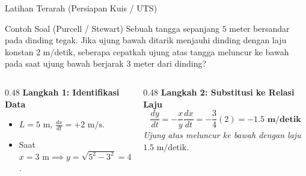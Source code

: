 \documentclass[aspectratio=169,10pt]{beamer}
\begin{document}
\begin{frame}{Latihan Terarah (Persiapan Kuis / UTS)}
    \begin{block}{Contoh Soal (Purcell / Stewart)}
        Sebuah tangga sepanjang $5\text{ meter}$ bersandar pada dinding tegak. 
        Jika ujung bawah ditarik menjauhi dinding dengan laju konstan $2\text{ m/detik}$,
        seberapa cepatkah ujung atas tangga meluncur ke bawah pada saat ujung bawah berjarak $3\text{ meter}$ dari dinding?
    \end{block}

    \pause
    \begin{columns}[T]
        \begin{column}{0.48\textwidth}
            \textbf{Langkah 1: Identifikasi Data}
            \begin{itemize}
                \item $L = 5\text{ m}$, $\frac{dx}{dt} = +2\text{ m/s}$.
                \item Saat $x = 3\text{ m} \implies y = \sqrt{5^2 - 3^2} = 4\text{ m}$.
            \end{itemize}
        \end{column}

        \begin{column}{0.48\textwidth}
            \textbf{Langkah 2: Substitusi ke Relasi Laju}
            \[
                \frac{dy}{dt} = -\frac{x}{y}\frac{dx}{dt} = -\frac{3}{4}(2) = -\mathbf{1.5\text{ m/detik}}
            \]
            \textit{Ujung atas meluncur ke bawah dengan laju $1.5\text{ m/detik}$.}
        \end{column}
    \end{columns}
\end{frame}
\end{document}
